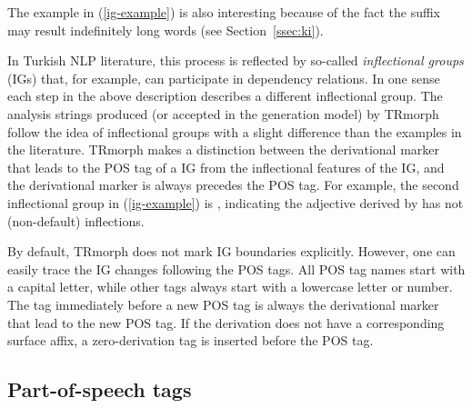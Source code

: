 \documentclass[twocolumn]{article}
\begin{document}
The example in (\ref{ig-example}) is also interesting because of the fact the suffix  may result indefinitely long words (see Section~\ref{ssec:ki}).


In Turkish NLP literature, this process is reflected by so-called \emph{inflectional groups} (IGs) that,
for example, can participate in dependency relations.
In one sense each step in the above description describes a different inflectional group.
The analysis strings produced (or accepted in the generation model) by TRmorph follow the idea of inflectional groups with a slight difference than the examples in the literature.
TRmorph makes a distinction between the derivational marker that leads to the POS tag of a IG from the inflectional features of the IG,  
and the derivational marker is always precedes the POS tag.
For example, the second inflectional group in (\ref{ig-example}) is ,
indicating the adjective derived by  has not (non-default) inflections.

By default, TRmorph does not mark IG boundaries explicitly. 
However, one can easily trace the IG changes following the POS tags. 
All POS tag names start with a capital letter, 
while other tags always start with a lowercase letter or number. 
The tag immediately before a new POS tag is always the derivational marker that lead to the new POS tag.
If the derivation does not have a corresponding surface affix, 
a zero-derivation tag  is inserted before the POS tag.

\subsection{Part-of-speech tags}
\end{document}
